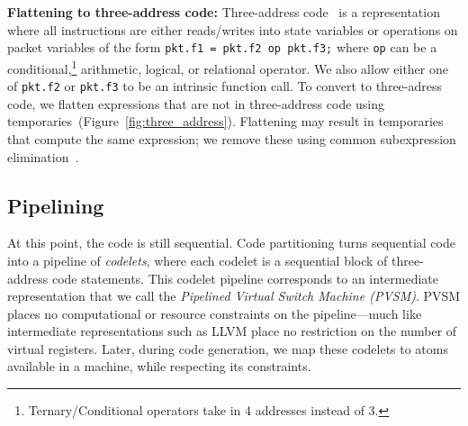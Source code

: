 \textbf{Flattening to three-address code: } Three-address code~\cite{tac} is a
representation where all instructions are either reads/writes into state
variables or operations on packet variables of the form \texttt{pkt.f1 = pkt.f2
op pkt.f3;} where \texttt{op} can be a
conditional,\footnote{Ternary/Conditional operators take in 4 addresses instead
of 3.} arithmetic, logical, or relational operator.  We also allow either one
of {\tt pkt.f2} or {\tt pkt.f3} to be an intrinsic function call.  To convert
to three-adress code, we flatten expressions that are not in three-address code
using temporaries~(Figure~\ref{fig:three_address}).  Flattening may result in
temporaries that compute the same expression; we remove these using common
subexpression elimination~\cite{cse}.


\subsection{Pipelining}
\label{ss:partitioning}
At this point, the code is still sequential. Code partitioning turns sequential
code into a pipeline of \textit{codelets}, where each codelet is a sequential
block of three-address code statements. This codelet pipeline corresponds to an
intermediate representation that we call the \textit{Pipelined Virtual Switch
Machine (PVSM)}. PVSM places no computational or resource constraints on the
pipeline---much like intermediate representations such as LLVM place no
restriction on the number of virtual registers. Later, during code generation,
we map these codelets to atoms available in a \absmachine machine, while
respecting its constraints.

